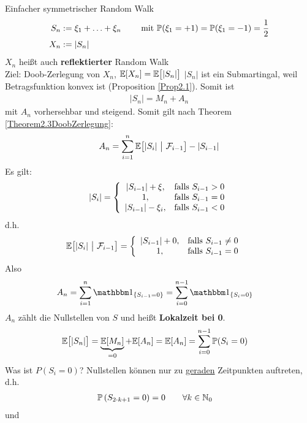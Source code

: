 \begin{beisp}
	Einfacher symmetrischer Random Walk 
	\begin{align*}
		S_n&:=\xi_1+\ldots+\xi_n \qquad\mit\P(\xi_1=+1)=\P(\xi_1=-1)=\frac{1}{2}\\
		X_n&:=|S_n|
	\end{align*}
	$X_n$ heißt auch \textbf{reflektierter} Random Walk\\
	Ziel: Doob-Zerlegung von $X_n$, $\E[X_n]=\E\big[|S_n|\big]$
	$|S_n|$ ist ein Submartingal, weil Betragsfunktion konvex ist (Proposition \ref{Prop2.1}). Somit ist
	\begin{align*}
		|S_n|=M_n+A_n
	\end{align*}
	mit $A_n$ vorhersehbar und steigend. Somit gilt nach Theorem \ref{Theorem2.3DoobZerlegung}:
	\begin{align*}
		A_n=\sum\limits_{i=1}^n \E\big[|S_i|~\big|~\F_{i-1}\big]-|S_{i-1}|
	\end{align*}
	Es gilt:
	\begin{align*}
		|S_i|=\left\lbrace\begin{array}{cl}
			|S_{i-1}|+\xi, & \falls S_{i-1}>0\\
			1, &\falls S_{i-1}=0\\
			|S_{i-1}|-\xi_i, &\falls S_{i-1}<0
		\end{array}\right.
	\end{align*}
	d.h.
	\begin{align*}
		\E\big[|S_i|~\big|~\F_{i-1}\big]&=\left\lbrace\begin{array}{cl}
			|S_{i-1}|+0, &\falls S_{i-1}\neq0\\
			1, &\falls S_{i-1}=0
		\end{array}\right.
	\end{align*}
	Also
	\begin{align*}
		A_n&=\sum\limits_{i=1}^n\indi_{\lbrace S_{i-1}=0\rbrace}=\sum\limits_{i=0}^{n-1}\indi_{\lbrace S_i=0\rbrace}
	\end{align*}
	$A_n$ zählt die Nullstellen von $S$ und heißt \textbf{Lokalzeit bei 0}.
	\begin{align*}
		\E\big[|S_n|\big]&=
		\underbrace{\E[M_n]}_{=0}+\E[A_n]
		=\E[A_n]
		=\sum\limits_{i=0}^{n-1}\P(S_i=0)
	\end{align*}
	Was ist $P(S_i=0)$? Nullstellen können nur zu \ul{geraden} Zeitpunkten auftreten, d.h.
	\begin{align*}
		\P\left(S_{2\cdot k+1}=0\right)&=0\qquad\forall k\in\N_0
	\end{align*}
	und
	\begin{align*}

\end{align*}
\end{beisp}
